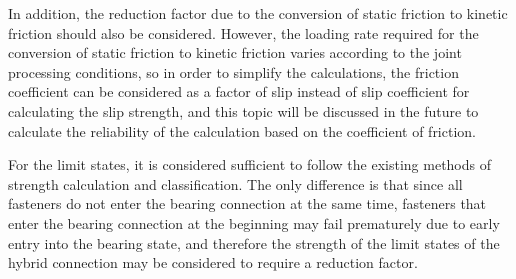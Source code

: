 In addition, the reduction factor due to the conversion of static friction to kinetic friction should also be considered. However, the loading rate required for the conversion of static friction to kinetic friction varies according to the joint processing conditions, so in order to simplify the calculations, the friction coefficient can be considered as a factor of slip instead of slip coefficient for calculating the slip strength, and this topic will be discussed in the future to calculate the reliability of the calculation based on the coefficient of friction.

For the limit states, it is considered sufficient to follow the existing methods of strength calculation and classification. The only difference is that since all fasteners do not enter the bearing connection at the same time, fasteners that enter the bearing connection at the beginning may fail prematurely due to early entry into the bearing state, and therefore the strength of the limit states of the hybrid connection may be considered to require a reduction factor.